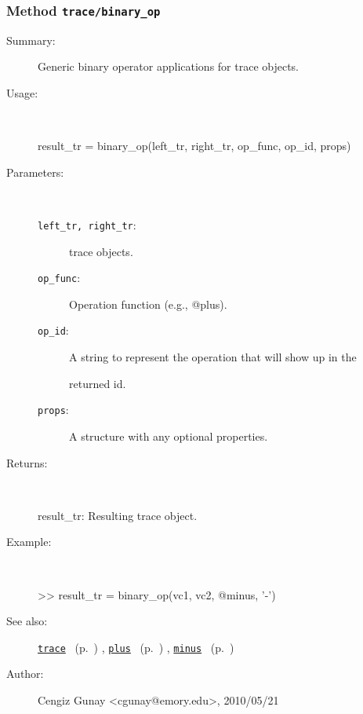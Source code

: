 \subsubsection[Method \texttt{binary\_op}]{Method \texttt{trace/binary\_op}}%
%
\label{ref_trace__binary_op}%
\hypertarget{ref_trace__binary_op}{}%
\begin{description}
\item[Summary:]Generic binary operator applications for trace objects.
%
\item[Usage:]~%
\begin{lyxcode}%
result\_tr = binary\_op(left\_tr, right\_tr, op\_func, op\_id, props)
%
\end{lyxcode}%
%
%
\item[Parameters:]~
\begin{description}%
\item[\texttt{left\_tr, right\_tr}:]
 trace objects.
\item[\texttt{op\_func}:]
 Operation function (e.g., @plus).
\item[\texttt{op\_id}:]
 A string to represent the operation that will show up in the

returned id.
\item[\texttt{props}:]
 A structure with any optional properties.
\end{description}%
%
\item[Returns:
]~

   result\_tr: Resulting trace object.
%
\item[Example:]~
\begin{lyxcode} >> result\_tr = binary\_op(vc1, vc2, @minus, '-')
\\%
\end{lyxcode}
%
\item[See also:]%
\hyperlink{ref_trace}{\texttt{trace}}%
\ (p.~\pageref{ref_trace})%
%
, \hyperlink{ref_plus}{\texttt{plus}}%
\ (p.~\pageref{ref_plus})%
%
, \hyperlink{ref_minus}{\texttt{minus}}%
\ (p.~\pageref{ref_minus})%
%
%
\item[Author:]%
Cengiz Gunay <cgunay@emory.edu>, 2010/05/21
%
\end{description}
\methodline%
